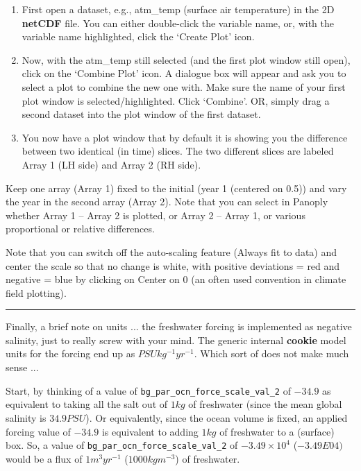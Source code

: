 \vspace{1mm}
\begin{enumerate}[noitemsep]
\vspace{1mm}
\item  First open a dataset, e.g., \textsf{\footnotesize atm\_temp} (surface air temperature) in the 2D \textbf{netCDF} file. You can either double-click the variable name, or, with the variable name highlighted, click the ‘Create Plot’ icon.
\vspace{1mm}
\item Now, with the \textsf{\footnotesize atm\_temp} still selected (and the first plot window still open), click on the ‘Combine Plot’ icon. A dialogue box will appear and ask you to select a plot to combine the new one with. Make sure the name of your first plot window is selected/highlighted. Click ‘Combine’. OR, simply drag a second dataset into the plot window of the first dataset.
\vspace{1mm}
\item You now have a plot window that by default it is showing you the difference between two identical (in time) slices. The two different slices are labeled Array 1 (LH side) and Array 2 (RH side).
\end{enumerate}
\vspace{1mm}

Keep one array (Array 1) fixed to the initial (year 1 (centered on 0.5)) and vary the year in the second array (Array 2). Note that you can select in Panoply whether Array 1 – Array 2 is plotted, or Array 2 – Array 1, or various proportional or relative differences.

Note that you can switch off the auto-scaling feature (Always fit to data) and center the scale so that no change is white, with positive deviations = red and negative = blue by clicking on Center on 0 (an often used convention in climate field plotting).

\vspace{1mm}\noindent\rule{4cm}{0.5pt}\vspace{2mm}

\noindent Finally, a brief note on units ... the freshwater forcing is implemented as negative salinity, just to really screw with your mind. The generic internal \textbf{cookie} model units for the forcing end up as \(PSU kg^{-1} yr^{-1}\). Which sort of does not make much sense ...

Start, by thinking of a value of \texttt{bg\_par\_ocn\_force\_scale\_val\_2} of \(-34.9\) as equivalent to taking all the salt out of \(1 kg\) of freshwater (since the mean global salinity is \(34.9 PSU\)). Or equivalently, since the ocean volume is fixed, an applied forcing value of \(-34.9\) is equivalent to adding \(1 kg\) of freshwater to a (surface) box. So, a value of \texttt{bg\_par\_ocn\_force\_scale\_val\_2} of \(-3.49\times10^{4}\) (\(-3.49E04)\) would be a flux of \(1 m^{3} yr^{-1}\) (\(1000 kg m^{-3}\)) of freshwater.

